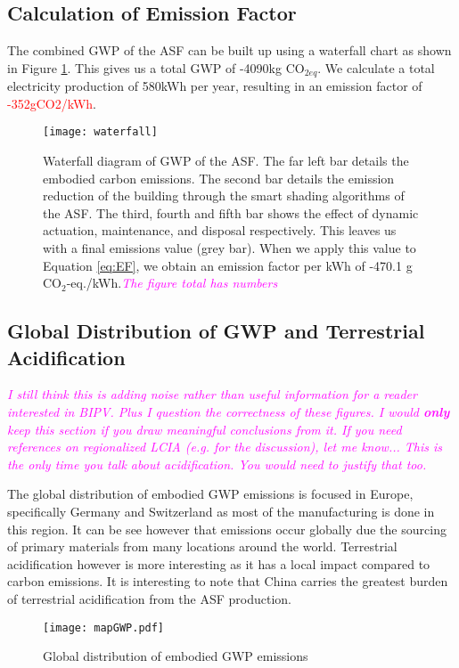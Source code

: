 \subsection{Calculation of Emission Factor}
The combined GWP of the ASF can be built up using a waterfall chart as shown in  Figure \ref{fig:waterfall}. This gives us a total GWP of -4090kg CO$_{2eq}$. We calculate a total electricity production of 580kWh per year, resulting in an emission factor of \textcolor{red}{-352gCO2/kWh}.

\begin{figure}[H]
\begin{center}
\texttt{[image: waterfall]}
\caption{Waterfall diagram of GWP of the ASF. The far left bar details the embodied carbon emissions. The second bar details the emission reduction of the building through the smart shading algorithms of the ASF. The third, fourth and fifth bar shows the effect of dynamic actuation, maintenance, and disposal respectively. This leaves us with a final emissions value (grey bar). When we apply this value to Equation \ref{eq:EF}, we obtain an emission factor per kWh of -470.1 g CO$_2$-eq./kWh.\textcolor{magenta}{\textit{The figure total has numbers}}}

\label{fig:waterfall}
\end{center}
\end{figure}

\subsection{Global Distribution of GWP and Terrestrial Acidification}
\textcolor{magenta}{\textit{I still think this is adding noise rather than useful information for a reader interested in BIPV. Plus I question the correctness of these figures. I would \textbf{only} keep this section if you draw meaningful conclusions from it. If you need references on regionalized LCIA (e.g. for the discussion), let me know... This is the only time you talk about acidification. You would need to justify that too.}}

The global distribution of embodied GWP emissions is focused in Europe, specifically Germany and Switzerland as most of the manufacturing is done in this region. It can be see however that emissions occur globally due the sourcing of primary materials from many locations around the world. Terrestrial acidification however is more interesting as it has a local impact compared to carbon emissions. It is interesting to note that China carries the greatest burden of terrestrial acidification from the ASF production. 
\begin{figure}[H]
\begin{center}
\texttt{[image: mapGWP.pdf]}
\caption{Global distribution of embodied GWP emissions}
\label{fig:mapGWP}
\end{center}
\end{figure}

